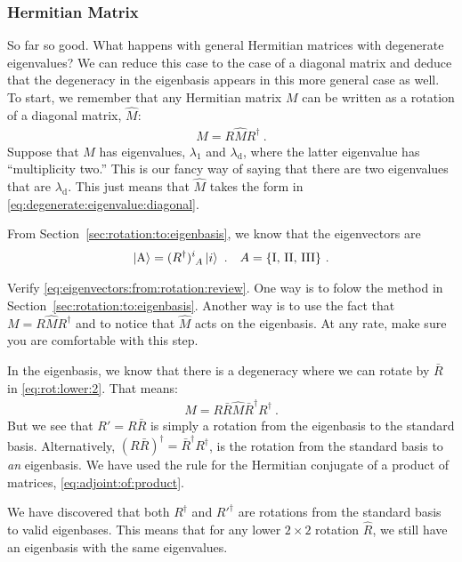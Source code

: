 \documentclass[12pt, oneside]{report}    %
\begin{document}
\subsubsection*{Hermitian Matrix}

So far so good. What happens with general Hermitian matrices with degenerate eigenvalues? We can reduce this case to the case of a diagonal matrix and deduce that the degeneracy in the eigenbasis appears in this more general case as well. To start, we remember that any Hermitian matrix $M$ can be written as a rotation of a diagonal matrix, $\hat M$: 
\begin{align}
    M = R \hat M R^\dag \ .
\end{align}
Suppose that $M$ has eigenvalues, $\lambda_1$ and $\lambda_\text{d}$, where the latter eigenvalue has ``multiplicity two.'' This is our fancy way of saying that there are two eigenvalues that are $\lambda_\text{d}$. This just means that $\hat M$ takes the form in \eqref{eq:degenerate:eigenvalue:diagonal}. 

From Section~\ref{sec:rotation:to:eigenbasis}, we know that the eigenvectors are 
\begin{align}
    \ket{\text{A}} &= (R^\dag)\aij{i}{A}\ket{i} \ .
    &
    A = \{\text{I, II, III}\} \ .
    \label{eq:eigenvectors:from:rotation:review}
\end{align}
\begin{exercise}
Verify \eqref{eq:eigenvectors:from:rotation:review}. One way is to folow the method in Section~\ref{sec:rotation:to:eigenbasis}. Another way is to use the fact that $M = R\hat{M}R^\dag$ and to notice that $\hat M$ acts on the eigenbasis. At any rate, make sure you are comfortable with this step. 
\end{exercise}
In the eigenbasis, we know that there is a degeneracy where we can rotate by $\bar R$ in \eqref{eq:rot:lower:2}. That means:
\begin{align}
    M = R \bar R\hat M \bar R^\dag R^\dag \ .
\end{align}
But we see that $R'= R\bar{R}$ is simply a rotation from the eigenbasis to the standard basis. Alternatively, $(R\bar R)^\dag = \bar R^\dag R^\dag$, is the rotation from the standard basis to \emph{an} eigenbasis. We have used the rule for the Hermitian conjugate of a product of matrices, \eqref{eq:adjoint:of:product}. 

We have discovered that both $R^\dag$ and $R'^\dag$ are rotations from the standard basis to valid eigenbases. This means that for any lower $2\times 2$ rotation $\hat R$, we still have an eigenbasis with the same eigenvalues. 
\end{document}
